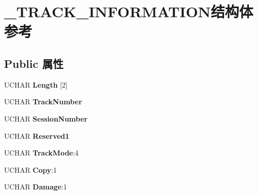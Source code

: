 \hypertarget{struct___t_r_a_c_k___i_n_f_o_r_m_a_t_i_o_n}{}\section{\+\_\+\+T\+R\+A\+C\+K\+\_\+\+I\+N\+F\+O\+R\+M\+A\+T\+I\+O\+N结构体 参考}
\label{struct___t_r_a_c_k___i_n_f_o_r_m_a_t_i_o_n}
\subsection*{Public 属性}
\begin{DoxyCompactItemize}
\item 
\mbox{\label{struct___t_r_a_c_k___i_n_f_o_r_m_a_t_i_o_n_a4cf4a538009eec960e315f660aa3b673}} 
U\+C\+H\+AR {\bfseries Length} \mbox{[}2\mbox{]}
\item 
\mbox{\label{struct___t_r_a_c_k___i_n_f_o_r_m_a_t_i_o_n_aba1bfcf0bc6190fa2b9d71b58bc9756d}} 
U\+C\+H\+AR {\bfseries Track\+Number}
\item 
\mbox{\label{struct___t_r_a_c_k___i_n_f_o_r_m_a_t_i_o_n_a6390ddef975ae48faa896e9fd4e443b6}} 
U\+C\+H\+AR {\bfseries Session\+Number}
\item 
\mbox{\label{struct___t_r_a_c_k___i_n_f_o_r_m_a_t_i_o_n_a89381d7b7ebd84bd050b99ab07d7e76d}} 
U\+C\+H\+AR {\bfseries Reserved1}
\item 
\mbox{\label{struct___t_r_a_c_k___i_n_f_o_r_m_a_t_i_o_n_a9d2f7b090004eb7bb5d76c800965eabc}} 
U\+C\+H\+AR {\bfseries Track\+Mode}\+:4
\item 
\mbox{\label{struct___t_r_a_c_k___i_n_f_o_r_m_a_t_i_o_n_a4d0b72f57da145736cf2ae736e3d4e0d}} 
U\+C\+H\+AR {\bfseries Copy}\+:1
\item 
\mbox{\label{struct___t_r_a_c_k___i_n_f_o_r_m_a_t_i_o_n_a92c6fe827f4cd64434c60b92cdcfc611}} 
U\+C\+H\+AR {\bfseries Damage}\+:1

\end{DoxyCompactItemize}
